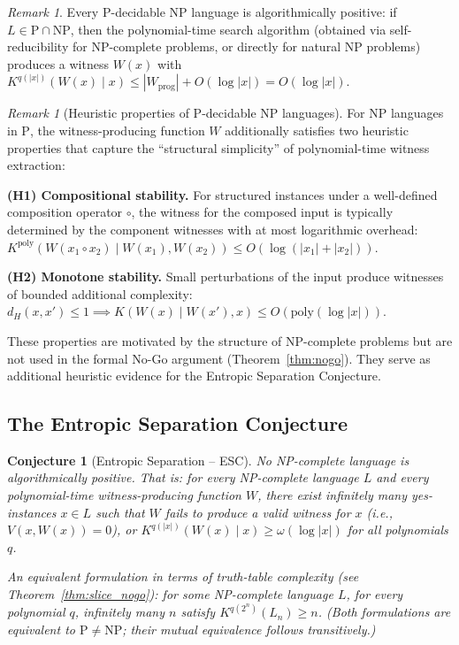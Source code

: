 \documentclass[aps,prd,twocolumn,superscriptaddress,nofootinbib]{revtex4-2}
\newtheorem{conjecture}[theorem]{Conjecture}
\theoremstyle{definition}
\theoremstyle{remark}
\newtheorem{remark}[theorem]{Remark}
\DeclareMathOperator{\poly}{poly}
\newcommand{\NP}{\mathrm{NP}}
\newcommand{\PP}{\mathrm{P}}
\begin{document}
\begin{remark}
Every $\PP$-decidable NP language is algorithmically positive: if $L \in \PP \cap \NP$, then the polynomial-time search algorithm (obtained via self-reducibility for NP-complete problems, or directly for natural NP problems) produces a witness $W(x)$ with $K^{q(|x|)}(W(x) \mid x) \leq |W_{\text{prog}}| + O(\log|x|) = O(\log|x|)$.
\end{remark}

\begin{remark}[Heuristic properties of P-decidable NP languages]
\label{rem:heuristic-ap}
For NP languages in $\PP$, the witness-producing function $W$ additionally satisfies two heuristic properties that capture the ``structural simplicity'' of polynomial-time witness extraction:

\textbf{(H1) Compositional stability.} For structured instances under a well-defined composition operator $\circ$, the witness for the composed input is typically determined by the component witnesses with at most logarithmic overhead: $K^{\poly}(W(x_1 \circ x_2) \mid W(x_1), W(x_2)) \leq O(\log(|x_1|+|x_2|))$.

\textbf{(H2) Monotone stability.} Small perturbations of the input produce witnesses of bounded additional complexity: $d_H(x,x') \leq 1 \implies K(W(x) \mid W(x'), x) \leq O(\mathrm{poly}(\log|x|))$.

These properties are motivated by the structure of $\NP$-complete problems but are not used in the formal No-Go argument (Theorem~\ref{thm:nogo}). They serve as additional heuristic evidence for the Entropic Separation Conjecture.
\end{remark}

\subsection{The Entropic Separation Conjecture}

\begin{conjecture}[Entropic Separation -- ESC]
\label{conj:entropic}
No NP-complete language is algorithmically positive. That is: for every NP-complete language $L$ and every polynomial-time witness-producing function $W$, there exist infinitely many yes-instances $x \in L$ such that $W$ fails to produce a valid witness for $x$ (i.e., $V(x, W(x)) = 0$), or $K^{q(|x|)}(W(x) \mid x) \geq \omega(\log|x|)$ for all polynomials $q$.

An equivalent formulation in terms of truth-table complexity (see Theorem~\ref{thm:slice_nogo}): for some NP-complete language $L$, for every polynomial $q$, infinitely many $n$ satisfy $K^{q(2^n)}(L_n) \geq n$. (Both formulations are equivalent to $\PP \neq \NP$; their mutual equivalence follows transitively.)
\end{conjecture}
\end{document}
